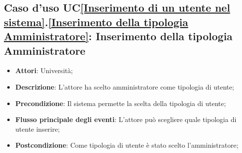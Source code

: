 \subsection{Caso d'uso UC\ref{Inserimento di un utente nel sistema}.\ref{Inserimento della tipologia Amministratore}: Inserimento della tipologia Amministratore}
\begin{itemize}
	\item \textbf{Attori}: Università;
	\item \textbf{Descrizione}: L'attore ha scelto amministratore come tipologia di utente; 
	\item \textbf{Precondizione}: Il sistema permette la scelta della tipologia di utente;
	\item \textbf{Flusso principale degli eventi}: L'attore può scegliere quale tipologia di utente inserire;
	\item \textbf{Postcondizione}: Come tipologia di utente è stato scelto l'amministratore;
\end{itemize}



